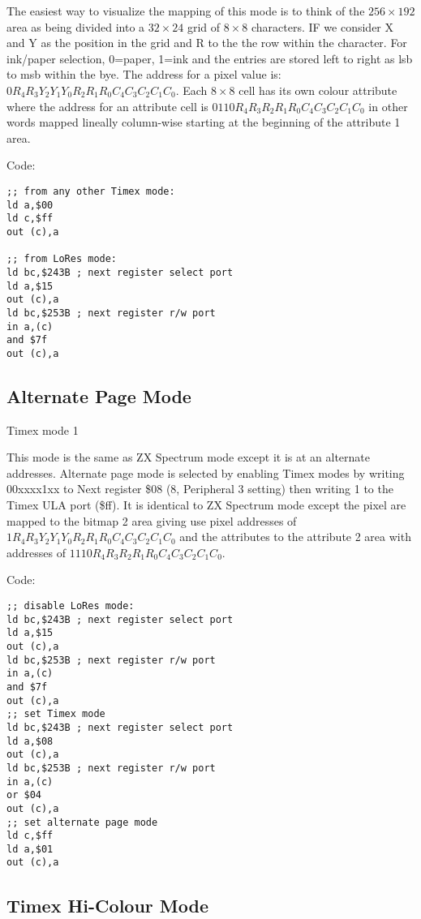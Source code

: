 The easiest way to visualize the mapping of this mode is to think of
the $256\times192$ area as being divided into a $32\times24$ grid of
$8\times8$ characters.  IF we consider X and Y as the position in the
grid and R to the the row within the character.  For ink/paper
selection, 0=paper, 1=ink and the entries are stored left to right as
lsb to msb within the bye.  The address for a pixel value is:
$0R_4R_3Y_2Y_1Y_0R_2R_1R_0C_4C_3C_2C_1C_0$. Each $8\times8$ cell has
its own colour attribute where the address for an attribute cell is
$0110R_4R_3R_2R_1R_0C_4C_3C_2C_1C_0$ in other words mapped lineally
column-wise starting at the beginning of the attribute 1 area.

\sinset
Code:
\begin{verbatim}
;; from any other Timex mode:
ld a,$00
ld c,$ff
out (c),a

;; from LoRes mode:
ld bc,$243B ; next register select port
ld a,$15
out (c),a
ld bc,$253B ; next register r/w port
in a,(c)
and $7f
out (c),a
\end{verbatim}
\einset

\subsection{Alternate Page Mode}

Timex mode 1

This mode is the same as ZX Spectrum mode except it is at an alternate
addresses. Alternate page mode is selected by enabling Timex modes by
writing 00xxxx1xx to Next register \$08 (8, Peripheral 3 setting) then
writing 1 to the Timex ULA port (\$ff).  It is identical to ZX
Spectrum mode except the pixel are mapped to the bitmap 2 area giving
use pixel addresses of $1R_4R_3Y_2Y_1Y_0R_2R_1R_0C_4C_3C_2C_1C_0$ and
the attributes to the attribute 2 area with addresses of
$1110R_4R_3R_2R_1R_0C_4C_3C_2C_1C_0$.

\sinset
Code:

\begin{verbatim}
;; disable LoRes mode:
ld bc,$243B ; next register select port
ld a,$15
out (c),a
ld bc,$253B ; next register r/w port
in a,(c)
and $7f
out (c),a
;; set Timex mode
ld bc,$243B ; next register select port
ld a,$08
out (c),a
ld bc,$253B ; next register r/w port
in a,(c)
or $04
out (c),a
;; set alternate page mode
ld c,$ff
ld a,$01
out (c),a
\end{verbatim}
\einset

\subsection{Timex Hi-Colour Mode}

